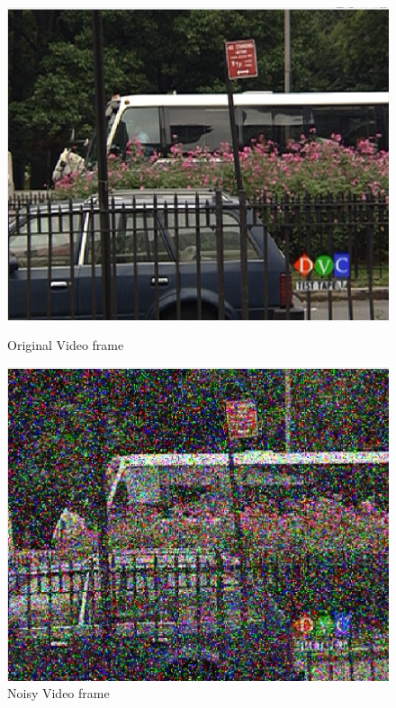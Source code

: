 \documentclass{article}
\begin{document}
\begin{figure}[H]
    \centering
    \begin{minipage}{.45\textwidth}
        \centering
        \includegraphics[width=\linewidth]{Images/Bus_original.png}
        \caption{Original Video frame}
        \label{fig:totalpowervst}
    \end{minipage}
    \begin{minipage}{.45\textwidth}
        \centering
        \includegraphics[width=\linewidth]{Images/Bus_2_noisy.png}
        \caption{Noisy Video frame}
    \end{minipage}
\end{figure}
\end{document}
